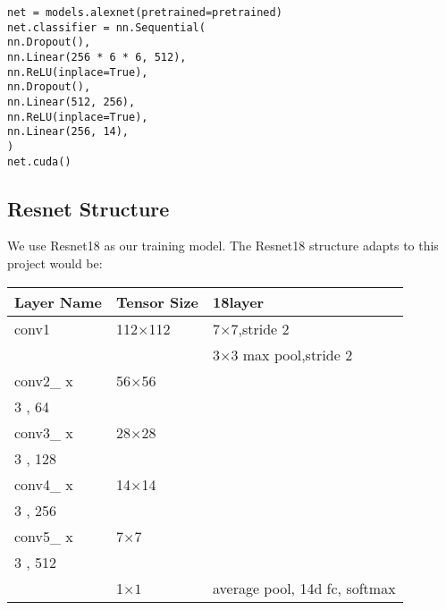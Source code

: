 \documentclass{article}
\begin{document}
\begin{commandline}
	\begin{verbatim}
net = models.alexnet(pretrained=pretrained)
net.classifier = nn.Sequential(
nn.Dropout(),
nn.Linear(256 * 6 * 6, 512),
nn.ReLU(inplace=True),
nn.Dropout(),
nn.Linear(512, 256),
nn.ReLU(inplace=True),
nn.Linear(256, 14),
)
net.cuda()
	\end{verbatim}
\end{commandline}






\subsection{Resnet Structure}

We use Resnet18 as our training model. The Resnet18 structure adapts to this project would be:

\begin{center} 
	\begin{tabular}{ | l | l | l |} 
		\hline 
		Layer Name & Tensor Size      & 18\-layer  \\ \hline 
		conv1  & 112$\times$112 & 7$\times$7,stride 2  \\ \hline 
		&                         & 3$\times$3 max pool,stride 2  \\ \hline 
		conv2\_ x    &  56$\times$56  & \( \left [  \begin{array}{lcl}  3 \times 3, 64 \\   3 \times 3, 64    \end{array}   \right] \times 2 \)\\ \hline
		conv3\_ x    &  28$\times$28  & \( \left [  \begin{array}{lcl}  3 \times 3, 128\\   3 \times 3, 128   \end{array}   \right] \times 2 \)\\ \hline
		conv4\_ x    &  14$\times$14  & \( \left [  \begin{array}{lcl}  3 \times 3, 256\\   3 \times 3, 256   \end{array}   \right] \times 2 \)\\ \hline
		conv5\_ x    &  7$\times$7     & \( \left [  \begin{array}{lcl}  3 \times 3, 512\\   3 \times 3, 512 \end{array}   \right] \times 2 \)\\ \hline
		& 1$\times 1$     & average pool, 14\-d fc, softmax \\ \hline
	\end{tabular}  
\end{center} 
\end{document}
